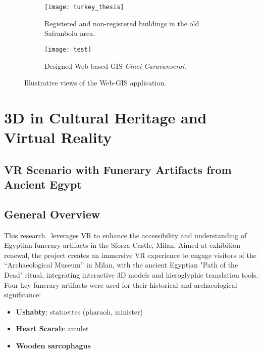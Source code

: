 \begin{figure}
  \centering
  \begin{subfigure}[b]{0.45\textwidth}
      \centering
      \texttt{[image: turkey\_thesis]}
      \caption{Registered and non-registered buildings in the old Safranbolu area.}
      \label{fig:x}
  \end{subfigure}
  \hfill
  \begin{subfigure}[b]{0.45\textwidth}
      \centering
      \texttt{[image: test]}
      \caption{Designed Web-based \gls{GIS} \textit{Cinci Caravanserai}.}
      \label{fig:y}
  \end{subfigure}
     \caption{Illustrative views of the Web-\gls{GIS} application.}
     \label{fig:z}
\end{figure}





\section{\gls{3D} in Cultural Heritage and Virtual Reality}
\label{sec:3d_vr}

\subsection{\gls{VR} Scenario with Funerary Artifacts from Ancient Egypt} 
\label{sec:3d_vr_devices}

\subsection*{General Overview}

This research~\cite{gonizzi20153d} leverages \gls{VR} to enhance the accessibility and understanding of Egyptian funerary artifacts in the Sforza Castle, Milan. 
Aimed at exhibition renewal, the project creates an immersive \gls{VR} experience to engage visitors of the “Archaeological Museum” in Milan, with the ancient Egyptian "Path of the Dead" ritual, integrating interactive \gls{3D} models and hieroglyphic translation tools. Four key funerary artifacts were used for their historical and archaeological significance:
\begin{itemize}
  \item \textbf{Ushabty}: statuettes (pharaoh, minister)
  \item \textbf{Heart Scarab}: amulet
  \item \textbf{Wooden sarcophagus} 
\end{itemize}


